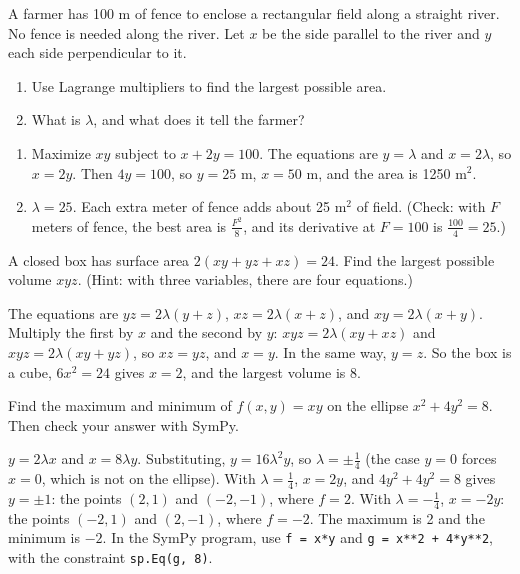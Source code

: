 \begin{Exercise}[title={Fencing by a River}, label=lm_river]
A farmer has 100 m of fence to enclose a rectangular field along a straight river. No
fence is needed along the river. Let $x$ be the side parallel to the river and $y$ each
side perpendicular to it.
\begin{enumerate}
\item Use Lagrange multipliers to find the largest possible area.
\item What is $\lambda$, and what does it tell the farmer?
\end{enumerate}
\end{Exercise}
\begin{Answer}[ref=lm_river]
\begin{enumerate}
\item Maximize $xy$ subject to $x + 2y = 100$. The equations are $y = \lambda$ and
$x = 2\lambda$, so $x = 2y$. Then $4y = 100$, so $y = 25$ m, $x = 50$ m, and the area is
1250 m$^2$.
\item $\lambda = 25$. Each extra meter of fence adds about 25 m$^2$ of field. (Check: with
$F$ meters of fence, the best area is $\frac{F^2}{8}$, and its derivative at $F = 100$ is
$\frac{100}{4} = 25$.)
\end{enumerate}
\end{Answer}

\begin{Exercise}[title={The Biggest Box}, label=lm_box]
A closed box has surface area $2(xy + yz + xz) = 24$. Find the largest possible volume
$xyz$. (Hint: with three variables, there are four equations.)
\end{Exercise}
\begin{Answer}[ref=lm_box]
The equations are $yz = 2\lambda(y + z)$, $xz = 2\lambda(x + z)$, and $xy = 2\lambda(x + y)$.
Multiply the first by $x$ and the second by $y$: $xyz = 2\lambda(xy + xz)$ and
$xyz = 2\lambda(xy + yz)$, so $xz = yz$, and $x = y$. In the same way, $y = z$. So the box is
a cube, $6x^2 = 24$ gives $x = 2$, and the largest volume is $8$.
\end{Answer}

\begin{Exercise}[title={An Ellipse}, label=lm_ellipse]
Find the maximum and minimum of $f(x, y) = xy$ on the ellipse $x^2 + 4y^2 = 8$. Then
check your answer with SymPy.
\end{Exercise}
\begin{Answer}[ref=lm_ellipse]
$y = 2\lambda x$ and $x = 8\lambda y$. Substituting, $y = 16\lambda^2 y$, so $\lambda = \pm\frac{1}{4}$
(the case $y = 0$ forces $x = 0$, which is not on the ellipse). With $\lambda = \frac{1}{4}$,
$x = 2y$, and $4y^2 + 4y^2 = 8$ gives $y = \pm 1$: the points $(2, 1)$ and $(-2, -1)$, where
$f = 2$. With $\lambda = -\frac{1}{4}$, $x = -2y$: the points $(-2, 1)$ and $(2, -1)$, where
$f = -2$. The maximum is 2 and the minimum is $-2$. In the SymPy program, use
\texttt{f = x*y} and \texttt{g = x**2 + 4*y**2}, with the
constraint \texttt{sp.Eq(g, 8)}.
\end{Answer}

